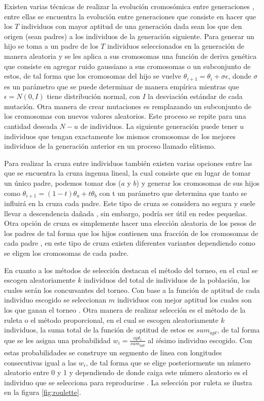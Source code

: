 \documentclass[twocolumn,spanish]{revtex4-1}
\begin{document}
Existen varias técnicas de realizar la evolución cromosómica entre generaciones \cite{such2017deep,Montana1989TrainingFN}, entre ellas se encuentra la evolución entre generaciones que consiste en hacer que los $T$ individuos con mayor aptitud de una generación dada sean los que den origen (sean padres) a los individuos de la generación siguiente. Para generar un hijo se toma a un padre de los $T$ individuos seleccionados en la generación de manera aleatoria y se les aplica a sus cromosomas una función de deriva genética que consiste en agregar ruido gaussiano a sus cromosomas o un subconjunto de estos, de tal forma que los cromosomas del hijo se vuelve $\theta_{i+1}=\theta_i + \sigma \epsilon$, donde $\sigma$ es un parámetro que se puede determinar de manera empírica mientras que $\epsilon = N(0, I)$ tiene distribución normal, con $I$ la desviación estándar de cada mutación. Otra manera de crear mutaciones es remplazando un subconjunto de los cromosomas con nuevos valores aleatorios. Este proceso se repite para una cantidad deseada $N-u$ de individuos. La siguiente generación puede tener $u$ individuos que tengan exactamente los mismos cromosomas de los mejores individuos de la generación anterior en un proceso llamado elitismo.

Para realizar la cruza entre individuos también existen varias opciones entre las que se encuentra la cruza ingenua lineal, la cual consiste que en lugar de tomar un único padre, podemos tomar dos ($a$ y $b$) y generar los cromosomas de sus hijos como $\theta_{i+1}=(1-t)\theta_a + t \theta_b$  con t un parámetro que determina que tanto se influirá en la cruza cada padre. Este tipo de cruza se considera no segura y suele llevar a descendencia dañada \cite{uriot2020safe}, sin embargo, podría ser útil en redes pequeñas. Otra opción de cruza es simplemente hacer una elección aleatoria de los pesos de los padres de tal forma que los hijos contienen una fracción de los cromosomas de cada padre \cite{Montana1989TrainingFN}, en este tipo de cruza existen diferentes variantes dependiendo como se eligen los cromosomas de cada padre.

En cuanto a los métodos de selección destacan el método del torneo, en el cual se escogen aleatoriamente $k$ individuos del total de individuos de la población, los cuales serán los concursantes del torneo. Con base a la función de aptitud de cada individuo escogido se seleccionan $m$ individuos con mejor aptitud los cuales son los que ganan el torneo \cite{blickle1996comparison}. Otra manera de realizar selección es el método de la ruleta o el método proporcional, en el cual se escogen aleatoriamente $k$ individuos, la suma total de la función de aptitud de estos es $sum_{apt}$, de tal forma que se les asigna una probabilidad $w_i=\frac{apt_i}{sum_{apt}}$ al $i$ésimo individuo escogido. Con estas probabilidades se construye un segmento de linea con longitudes consecutivas igual a las $w_i$, de tal forma que se elige posteriormente un número aleatorio entre 0 y 1 y dependiendo de donde caiga este número aleatorio es el individuo que se selecciona para reproducirse \cite{lipowski2012roulette}. La selección por ruleta se ilustra en la figura \ref{fig:roulette}.
\end{document}
